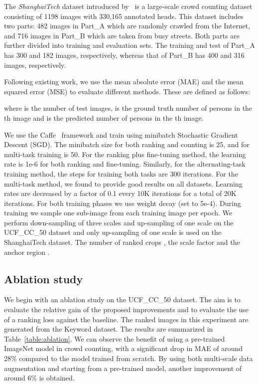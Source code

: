 \documentclass[10pt,twocolumn,letterpaper]{article}
\begin{document}
The \emph{ShanghaiTech} dataset introduced by~\cite{zhang2016single}
is a large-scale crowd counting dataset consisting of 1198 images with
330,165 annotated heads. This dataset includes two parts: 482 images
in Part\_A which are randomly crawled from the Internet, and 716
images in Part\_B which are taken from busy streets. Both parts are
further divided into training and evaluation sets. The training and
test of Part\_A has 300 and 182 images, respectively, whereas that of
Part\_B has 400 and 316 images, respectively.

Following existing work, we use the mean absolute
error (MAE) and the mean squared error (MSE) to evaluate different
methods. These are defined as follows:

where  is the number of test images,  is the
ground truth number of persons in the th image and
 is the predicted number of persons in the
th image.


We use the Caffe~\cite{jia2014caffe} framework and train using
minibatch Stochastic Gradient Descent (SGD). The minibatch size for
both ranking and counting is 25, and for multi-task training is
50. For the ranking plus fine-tuning method, the learning rate is 1e-6
for both ranking and fine-tuning. Similarly, for the alternating-task
training method, the steps for training both tasks are 300
iterations. For the multi-task method, we found  to provide good results on all datasets. Learning rates are decreased by a factor
of 0.1 every 10K iterations for a total of 20K iterations. For both
training phases we use  weight decay (set to 5e-4). During
training we sample one sub-image from each training image per
epoch. We perform down-sampling of three scales and up-sampling of one
scale on the UCF\_CC\_50 dataset and only up-sampling of one scale is
used on the ShanghaiTech dataset. The number of ranked crops , the scale factor  and the anchor region .

\subsection{Ablation study}
We begin with an ablation study on the UCF\_CC\_50 dataset. The aim is
to evaluate the relative gain of the proposed improvements and
to evaluate the use of a ranking loss against the baseline. The ranked
images in this experiment are generated from the Keyword dataset. The results are summarized in Table~\ref{table:ablation}. We can observe the benefit of using a pre-trained ImageNet model in crowd counting, with a significant drop in MAE of around 28\% compared to the model trained from scratch. By using both multi-scale data augmentation and starting from a pre-trained model, another improvement of around 6\% is obtained.
\end{document}
